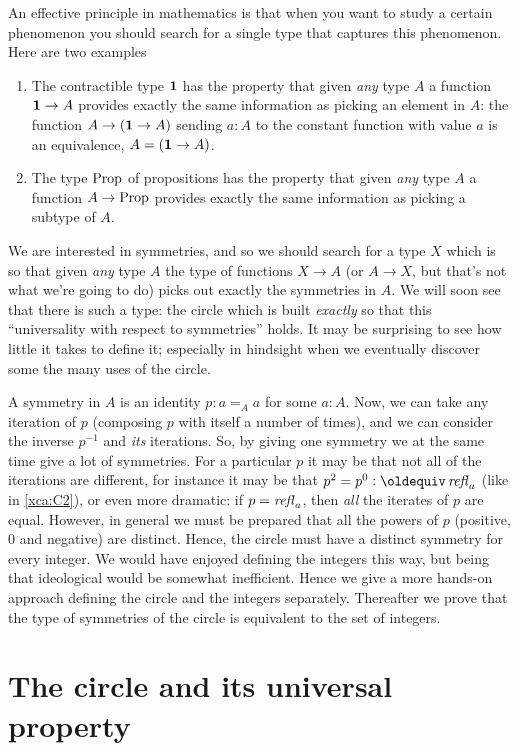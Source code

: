 
\label{cha:circle}

An effective principle in mathematics is that when you want to study a certain 
phenomenon you should search for a single type that captures this phenomenon.  
Here are two examples
\begin{enumerate}
\item The contractible type $\mathbf{1}$ has the property that given 
\emph{any} type $A$ a function $\mathbf{1}\to A$ provides exactly the 
same information as picking an element in $A$: 
the function $A\to (\mathbf{1}\to A)$ sending $a:A$ to the 
constant function with value $a$ is an equivalence, \ie $A=(\mathbf{1}\to A)$.
\item The type $\mathord{\mathrm{Prop}}$ of propositions has the property that 
given \emph{any} type $A$ a function $A\to\mathord{\mathrm{Prop}}$ provides exactly 
the same information as picking a subtype of $A$.
\end{enumerate}
We are interested in symmetries, and so we should search for a type $X$ which is so that given \emph{any} type $A$ the type of functions $X\to A$ (or $A\to X$, but that's not what we're going to do) picks out exactly the symmetries in $A$.  We will soon see that there is such a type: the circle which is built \emph{exactly} so that this ``universality with respect to symmetries'' holds.  It may be surprising to see how little it takes to define it; especially in hindsight when we eventually discover some the many uses of the circle.

A symmetry in $A$ is an identity $p:a=_Aa$ for some $a:A$.  
Now, we can take any iteration of $p$ (composing $p$ with itself a number of times), 
and we can consider the inverse $p^{-1}$ and \emph{its} iterations.  
So, by giving one symmetry we at the same time give a lot of symmetries.  
For a particular $p$ it may be that not all of the iterations are different, 
for instance it may be that $p^2=p^0\defequi\refl a$ (like in \cref{xca:C2}), 
or even more dramatic: if  $p=\mathop{{\it refl}_{a}}$, then \emph{all} the iterates of $p$ are equal. 
However, in general we must be prepared that all the powers of $p$ 
(positive, $0$ and negative) are distinct. 
Hence, the circle must have a distinct symmetry for every integer. 
We would have enjoyed defining the integers this way, 
but being that ideological would be somewhat inefficient. 
Hence we give a more hands-on approach defining the circle 
and the integers separately. Thereafter we prove that the type of 
symmetries of the circle is equivalent to the set of integers. 

\section{The circle and its universal property}
\label{sec:S1}


